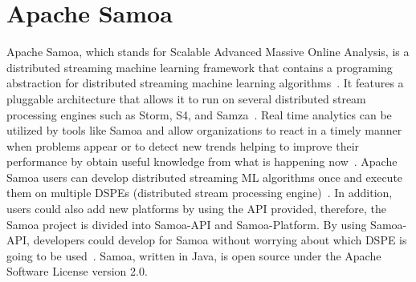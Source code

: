 \section{Apache Samoa}
Apache Samoa, which stands for Scalable Advanced Massive Online Analysis, is a distributed 
streaming machine learning framework that contains a programing abstraction for distributed 
streaming machine learning algorithms~\cite{hid-sp18-405-www-samoa}. It features a pluggable 
architecture that allows it to run on several distributed stream processing engines such as Storm, S4, 
and Samza~\cite{hid-sp18-405-www-samoa}. Real time analytics can be utilized by tools like Samoa 
and allow organizations to react in a timely manner when problems appear or to detect new trends 
helping to improve their performance by obtain useful knowledge from what is happening 
now~\cite{hid-sp18-405-bif2015mining-samoa}. Apache Samoa users can 
develop distributed streaming ML algorithms once and execute them on multiple DSPEs (distributed 
stream processing engine)~\cite{hid-sp18-405-mor2015samoa-samoa}. In addition, users could also 
add new platforms by using the API provided, therefore, the Samoa project is divided into Samoa-API 
and Samoa-Platform. By using Samoa-API, developers could develop for Samoa without worrying about 
which DSPE is going to be used~\cite{hid-sp18-405-blog-samoa}. Samoa, written in Java, is open 
source under the Apache Software License version 2.0.

